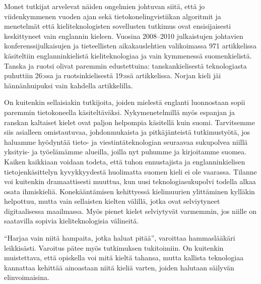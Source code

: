 \begin{multicols}{2}
Monet tutkijat arvelevat näiden ongelmien johtuvan siitä, että jo viidenkymmenen vuoden ajan sekä tietokonelingvistiikan algoritmit ja menetelmät että kieliteknologisten sovellusten tutkimus ovat ensisijaisesti keskittyneet vain englannin kieleen. Vuosina 2008--2010 julkaistujen johtavien konferenssijulkaisujen ja tieteellisten aikakauslehtien valikoimassa 971 artikkelissa käsiteltiin englanninkielistä kieliteknologiaa ja vain kymmenessä suomenkielistä. Tanska ja ruotsi olivat paremmin edustettuina: tanskankielisestä teknologiasta puhuttiin 26:ssa ja ruotsinkielisestä 19:ssä artikkelissa. Norjan kieli jäi hännänhuipuksi vain kahdella artikkelilla.

On kuitenkin sellaisiakin tutkijoita, joiden mielestä englanti luonnostaan sopii paremmin tietokoneella käsiteltäväksi. Nykymenetelmillä myös espanjan ja ranskan kaltaiset kielet ovat paljon helpompia käsitellä kuin suomi. Tarvitsemme siis asialleen omistautuvaa, johdonmukaista ja pitkäjänteistä tutkimustyötä, jos haluamme hyödyntää tieto- ja viestintäteknologian seuraavaa sukupolvea niillä yksityis- ja työelämämme alueilla, joilla nyt puhumme ja kirjoitamme suomea.
Kaiken kaikkiaan voidaan todeta, että tuhon ennustajista ja englanninkielisen tietojenkäsittelyn kyvykkyydestä huolimatta suomen kieli ei ole vaarassa. Tilanne voi kuitenkin dramaattisesti muuttua, kun uusi teknologiasukupolvi todella alkaa osata ihmiskieliä. Konekääntämisen kehittyessä kielimuurien ylittäminen kylläkin helpottuu, mutta vain sellaisten kielten välillä, jotka ovat selviytyneet digitaalisessa maailmassa. Myös pienet kielet selviytyvät varmemmin, jos niille on saatavilla sopivia kieliteknologisia välineitä.

``Harjaa vain niitä hampaita, jotka haluat pitää'', varoittaa hammaslääkäri leikkisästi. Varoitus pätee myös tutkimuksen tukitoimiin. On kuitenkin muistettava, että opiskella voi mitä kieltä tahansa, mutta kallista teknologiaa kannattaa kehittää ainoastaan niitä kieliä varten, joiden halutaan säilyvän elinvoimaisina.


\end{multicols}
